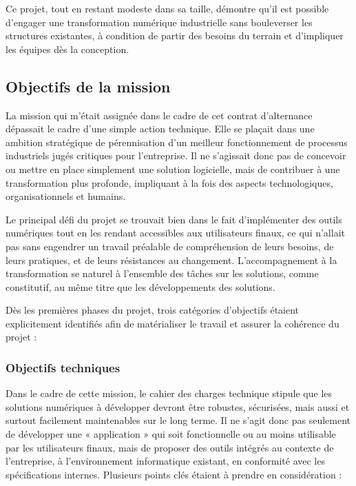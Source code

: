 \documentclass[11pt,a4paper]{article}
\begin{document}
Ce projet, tout en restant modeste dans sa taille, démontre qu’il est possible d’engager une transformation numérique industrielle sans bouleverser les structures existantes, à condition de partir des besoins du terrain et d’impliquer les équipes dès la conception.

\subsection{Objectifs de la mission}

La mission qui m’était assignée dans le cadre de cet contrat d'alternance dépassait le cadre d’une simple action technique. Elle se plaçait dans une ambition stratégique de pérennisation d’un meilleur fonctionnement de processus industriels jugés critiques pour l’entreprise. Il ne s’agissait donc pas de concevoir ou mettre en place simplement une solution logicielle, mais de contribuer à une transformation plus profonde, impliquant à la fois des aspects technologiques, organisationnels et humains.

Le principal défi du projet se trouvait bien dans le fait d’implémenter des outils numériques tout en les rendant accessibles aux utilisateurs finaux, ce qui n’allait pas sans engendrer un travail préalable de compréhension de leurs besoins, de leurs pratiques, et de leurs résistances au changement. L’accompagnement à la transformation se naturel à l’ensemble des tâches sur les solutions, comme constitutif, au même titre que les développements des solutions.

Dès les premières phases du projet, trois catégories d’objectifs étaient explicitement identifiés afin de matérialiser le travail et assurer la cohérence du projet :

\subsubsection{Objectifs techniques}

Dans le cadre de cette mission, le cahier des charges technique stipule que les solutions numériques à développer devront être robustes, sécurisées, mais aussi et surtout facilement maintenables sur le long terme. Il ne s’agit donc pas seulement de développer une « application » qui soit fonctionnelle ou au moins utilisable par les utilisateurs finaux, mais de proposer des outils intégrés au contexte de l’entreprise, à l’environnement informatique existant, en conformité avec les spécifications internes. Plusieurs points clés étaient à prendre en considération :
\end{document}
